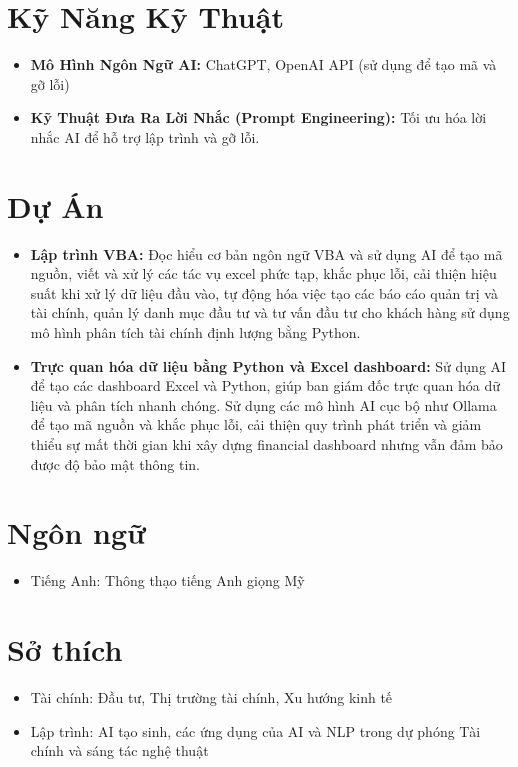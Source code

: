\documentclass[a4paper,12pt]{article}
\begin{document}
\section{Kỹ Năng Kỹ Thuật}
\begin{itemize}[left=0pt]
    \item \textbf{Mô Hình Ngôn Ngữ AI:} ChatGPT, OpenAI API (sử dụng để tạo mã và gỡ lỗi)
    \item \textbf{Kỹ Thuật Đưa Ra Lời Nhắc (Prompt Engineering):} Tối ưu hóa lời nhắc AI để hỗ trợ lập trình và gỡ lỗi.
\end{itemize}

\section{Dự Án}
\begin{itemize}[left=0pt]
    \item \textbf{Lập trình VBA:} Đọc hiểu cơ bản ngôn ngữ VBA và sử dụng AI để tạo mã nguồn, viết và xử lý các tác vụ excel phức tạp, khắc phục lỗi, cải thiện hiệu suất khi xử lý dữ liệu đầu vào, tự động hóa việc tạo các báo cáo quản trị và tài chính, quản lý danh mục đầu tư và tư vấn đầu tư cho khách hàng sử dụng mô hình phân tích tài chính định lượng bằng Python. 
    \item \textbf{Trực quan hóa dữ liệu bằng Python và Excel dashboard:} Sử dụng AI để tạo các dashboard Excel và Python, giúp ban giám đốc trực quan hóa dữ liệu và phân tích nhanh chóng. Sử dụng các mô hình AI cục bộ như Ollama để tạo mã nguồn và khắc phục lỗi, cải thiện quy trình phát triển và giảm thiểu sự mất thời gian khi xây dựng financial dashboard nhưng vẫn đảm bảo được độ bảo mật thông tin.
\end{itemize}


\section*{Ngôn ngữ}
\begin{itemize}[leftmargin=0.5cm]
    \item Tiếng Anh: Thông thạo tiếng Anh giọng Mỹ
\end{itemize}

\section*{Sở thích}
\begin{itemize}[leftmargin=0.5cm]
    \item Tài chính: Đầu tư, Thị trường tài chính, Xu hướng kinh tế
    \item Lập trình: AI tạo sinh, các ứng dụng của AI và NLP trong dự phóng Tài chính và sáng tác nghệ thuật
\end{itemize}
\end{document}
